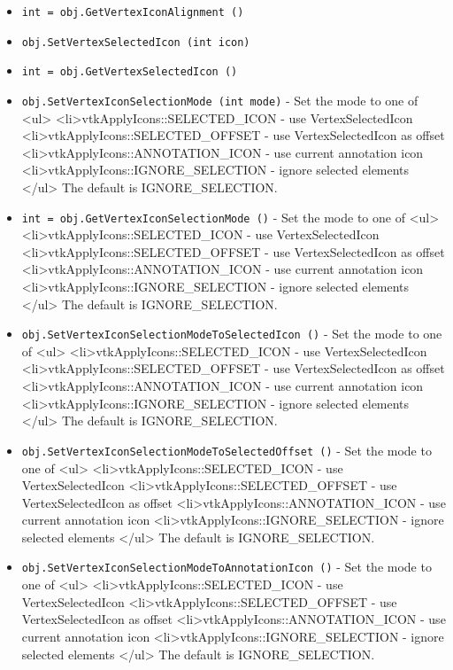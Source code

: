 \begin{itemize}
\item  \verb|int = obj.GetVertexIconAlignment ()|

\item  \verb|obj.SetVertexSelectedIcon (int icon)|

\item  \verb|int = obj.GetVertexSelectedIcon ()|

\item  \verb|obj.SetVertexIconSelectionMode (int mode)| -  Set the mode to one of
 <ul>
 <li>vtkApplyIcons::SELECTED\_ICON - use VertexSelectedIcon
 <li>vtkApplyIcons::SELECTED\_OFFSET - use VertexSelectedIcon as offset
 <li>vtkApplyIcons::ANNOTATION\_ICON - use current annotation icon
 <li>vtkApplyIcons::IGNORE\_SELECTION - ignore selected elements
 </ul>
 The default is IGNORE\_SELECTION.

\item  \verb|int = obj.GetVertexIconSelectionMode ()| -  Set the mode to one of
 <ul>
 <li>vtkApplyIcons::SELECTED\_ICON - use VertexSelectedIcon
 <li>vtkApplyIcons::SELECTED\_OFFSET - use VertexSelectedIcon as offset
 <li>vtkApplyIcons::ANNOTATION\_ICON - use current annotation icon
 <li>vtkApplyIcons::IGNORE\_SELECTION - ignore selected elements
 </ul>
 The default is IGNORE\_SELECTION.

\item  \verb|obj.SetVertexIconSelectionModeToSelectedIcon ()| -  Set the mode to one of
 <ul>
 <li>vtkApplyIcons::SELECTED\_ICON - use VertexSelectedIcon
 <li>vtkApplyIcons::SELECTED\_OFFSET - use VertexSelectedIcon as offset
 <li>vtkApplyIcons::ANNOTATION\_ICON - use current annotation icon
 <li>vtkApplyIcons::IGNORE\_SELECTION - ignore selected elements
 </ul>
 The default is IGNORE\_SELECTION.

\item  \verb|obj.SetVertexIconSelectionModeToSelectedOffset ()| -  Set the mode to one of
 <ul>
 <li>vtkApplyIcons::SELECTED\_ICON - use VertexSelectedIcon
 <li>vtkApplyIcons::SELECTED\_OFFSET - use VertexSelectedIcon as offset
 <li>vtkApplyIcons::ANNOTATION\_ICON - use current annotation icon
 <li>vtkApplyIcons::IGNORE\_SELECTION - ignore selected elements
 </ul>
 The default is IGNORE\_SELECTION.

\item  \verb|obj.SetVertexIconSelectionModeToAnnotationIcon ()| -  Set the mode to one of
 <ul>
 <li>vtkApplyIcons::SELECTED\_ICON - use VertexSelectedIcon
 <li>vtkApplyIcons::SELECTED\_OFFSET - use VertexSelectedIcon as offset
 <li>vtkApplyIcons::ANNOTATION\_ICON - use current annotation icon
 <li>vtkApplyIcons::IGNORE\_SELECTION - ignore selected elements
 </ul>
 The default is IGNORE\_SELECTION.


\end{itemize}
